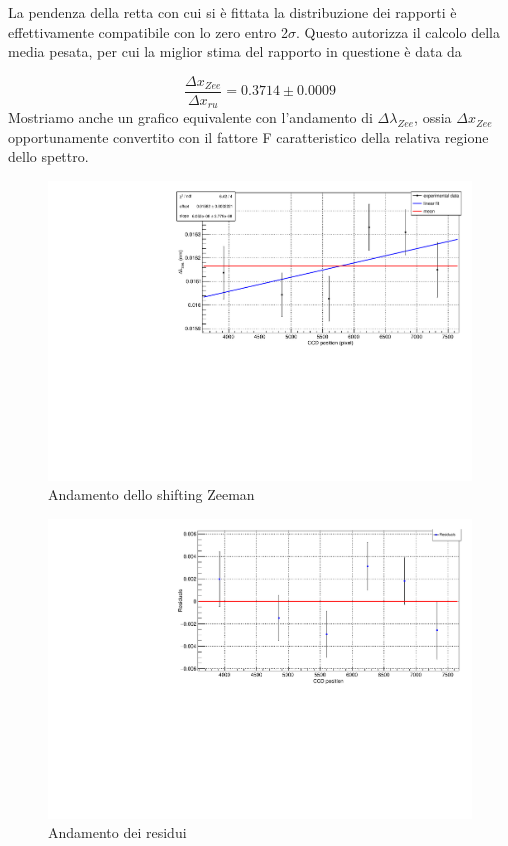 \documentclass{article}
\begin{document}
	La pendenza della retta con cui si è fittata la distribuzione dei rapporti è effettivamente
	compatibile con lo zero entro 2$\sigma$. Questo autorizza il calcolo della media pesata, per cui 
	la miglior stima del rapporto in questione è data da 

	\[
		\frac{\Delta x_{Zee}}{\Delta x_{ru}} = 0.3714 \pm 0.0009	
	\]
	Mostriamo anche un grafico equivalente con l'andamento di $\Delta\lambda_{Zee}$, ossia 
	$\Delta x_{Zee}$ opportunamente convertito con il fattore F caratteristico della relativa regione
	dello spettro.

	\begin{center}
		\begin{figure}[H]
			\centering
			\includegraphics[scale=0.38, angle=0]{campomax/dlambdazee.pdf}
			\setlength{\belowcaptionskip}{-20pt}
			\caption{Andamento dello shifting Zeeman}
			\label{fig:fit_dlambdazee}
		\end{figure}
	\end{center}

	\begin{center}
		\begin{figure}[H]
			\centering
			\includegraphics[scale=0.38, angle=0]{campomax/residuals.pdf}
			\setlength{\belowcaptionskip}{-20pt}
			\caption{Andamento dei residui}
			\label{fig:fit_dlambdazee_res}
		\end{figure}
	\end{center}
\end{document}

